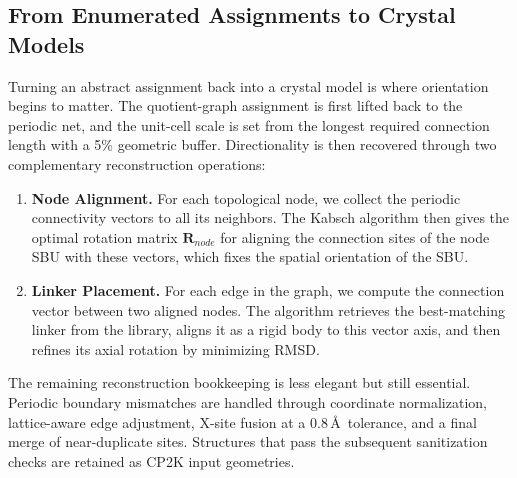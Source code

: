 \documentclass[pdflatex,sn-mathphys-num]{sn-jnl}
\theoremstyle{thmstyleone}%
\begin{document}
\subsection*{From Enumerated Assignments to Crystal Models}
Turning an abstract assignment back into a crystal model is where orientation begins to matter. The quotient-graph assignment is first lifted back to the periodic net, and the unit-cell scale is set from the longest required connection length with a 5\% geometric buffer. Directionality is then recovered through two complementary reconstruction operations:

\begin{enumerate}
\item \textbf{Node Alignment.} For each topological node, we collect the periodic connectivity vectors to all its neighbors.
The Kabsch algorithm then gives the optimal rotation matrix $\mathbf{R}_{node}$ for aligning the connection sites of the node SBU with these vectors, which fixes the spatial orientation of the SBU.

\item \textbf{Linker Placement.} For each edge in the graph, we compute the connection vector between two aligned nodes.
The algorithm retrieves the best-matching linker from the library, aligns it as a rigid body to this vector axis, and then refines its axial rotation by minimizing RMSD.
\end{enumerate}


The remaining reconstruction bookkeeping is less elegant but still essential. Periodic boundary mismatches are handled through coordinate normalization, lattice-aware edge adjustment, X-site fusion at a 0.8\,\AA\ tolerance, and a final merge of near-duplicate sites. Structures that pass the subsequent sanitization checks are retained as CP2K input geometries.
\end{document}
